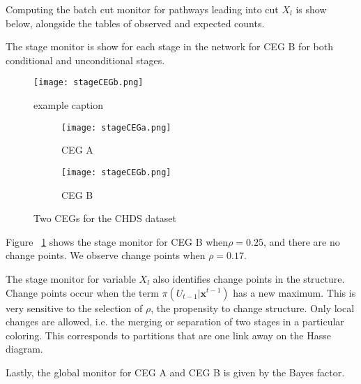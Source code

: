 \documentclass[12pt]{article}
\begin{document}
Computing the batch cut monitor for pathways leading into cut $X_l$ is show below, alongside the tables of observed and expected counts.

The stage monitor is show for each stage in the network for CEG B for both conditional and unconditional stages. 

\begin{figure}[htbp] %
   \centering
   \texttt{[image: stageCEGb.png]} 
   \caption{example caption}
   \label{fig:stagecegb}
\end{figure}


\begin{figure}
\centering
\begin{subfigure}{.5\textwidth}
  \centering
  \texttt{[image: stageCEGa.png]}
  \caption{CEG A}
  \label{fig:CEGa}
\end{subfigure}%
\begin{subfigure}{.5\textwidth}
  \centering
  \texttt{[image: stageCEGb.png]}
  \caption{CEG B}
  \label{fig:CEGb}
\end{subfigure}
\caption{Two CEGs for the CHDS dataset}
\label{fig:cegs}
\end{figure}
Figure ~\ref {fig:stagecegb} shows the stage monitor for CEG B when$\rho = 0.25$, and there are no change points. We observe change points when $\rho = 0.17$.

The stage monitor for variable $X_l$ also identifies change points in the structure. Change points occur when the term $\pi(U_{t-1} | \bm{x}^{t-1})$ has a new maximum. This is very sensitive to the selection of $\rho$, the propensity to change structure. Only local changes are allowed, i.e. the merging or separation of two stages in a particular coloring. This corresponds to partitions that are one link away on the Hasse diagram. 

Lastly, the global monitor for CEG A and CEG B is given by the Bayes factor. 
 
%
%
%	
%	
\end{document}
